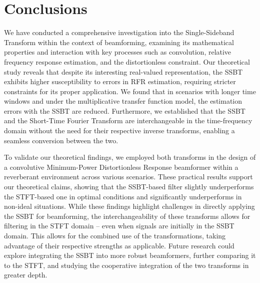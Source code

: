 \section{Conclusions}
\label{sec:conclusion}

We have conducted a comprehensive investigation into the Single-Sideband Transform within the context of beamforming, examining its mathematical properties and interaction with key processes such as convolution, relative frequency response estimation, and the distortionless constraint.
Our theoretical study reveals that despite its interesting real-valued representation, the SSBT exhibits higher susceptibility to errors in RFR estimation, requiring stricter constraints for its proper application. We found that in scenarios with longer time windows and under the multiplicative transfer function model, the estimation errors with the SSBT are reduced. Furthermore, we established that the SSBT and the Short-Time Fourier Transform are interchangeable in the time-frequency domain without the need for their respective inverse transforms, enabling a seamless conversion between the two.

To validate our theoretical findings, we employed both transforms in the design of a convolutive Minimum-Power Distortionless Response beamformer within a reverberant environment across various scenarios. These practical results support our theoretical claims, showing that the SSBT-based filter slightly underperforms the STFT-based one in optimal conditions and significantly underperforms in non-ideal situations.
While these findings highlight challenges in directly applying the SSBT for beamforming, the interchangeability of these transforms allows for filtering in the STFT domain -- even when signals are initially in the SSBT domain. This allows for the combined use of the transformations, taking advantage of their respective strengths as applicable.
Future research could explore integrating the SSBT into more robust beamformers, further comparing it to the STFT, and studying the cooperative integration of the two transforms in greater depth.